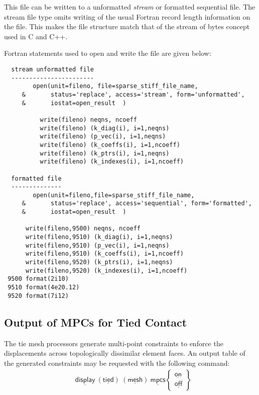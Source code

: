 \documentclass[11pt]{report}
\numberwithin{equation}{section}
\newcommand{\nin} {\noindent}
\newcommand{\ul} {\underline}
\newcommand{\hv} {\mathsf}   %
\newcommand{\ti}{\emph}
\begin{document}
This file can be written to a unformatted \ti{stream} or formatted sequential file. 
The stream file type omits writing of the usual Fortran record length 
information on the file. This makes the file structure
match that  of the stream of bytes concept used in C and C++.

Fortran statements used to open and 
write the file are given below:
\small
\begin{verbatim}
  stream unformatted file
  -----------------------
        open(unit=fileno, file=sparse_stiff_file_name,
     &       status='replace', access='stream', form='unformatted',
     &       iostat=open_result  )

          write(fileno) neqns, ncoeff
          write(fileno) (k_diag(i), i=1,neqns)
          write(fileno) (p_vec(i), i=1,neqns)
          write(fileno) (k_coeffs(i), i=1,ncoeff)
          write(fileno) (k_ptrs(i), i=1,neqns)
          write(fileno) (k_indexes(i), i=1,ncoeff)

  formatted file
  --------------
        open(unit=fileno,file=sparse_stiff_file_name,
     &       status='replace', access='sequential', form='formatted',
     &       iostat=open_result  )

      write(fileno,9500) neqns, ncoeff
      write(fileno,9510) (k_diag(i), i=1,neqns)
      write(fileno,9510) (p_vec(i), i=1,neqns)
      write(fileno,9510) (k_coeffs(i), i=1,ncoeff)
      write(fileno,9520) (k_ptrs(i), i=1,neqns)
      write(fileno,9520) (k_indexes(i), i=1,ncoeff)
 9500 format(2i10)
 9510 format(4e20.12)
 9520 format(7i12)
\end{verbatim}
\normalsize

\subsection{Output of MPCs for Tied Contact}
\nin The tie mesh processors generate multi-point constraints to enforce the 
displacements across topologically dissimilar element faces. 
An output table of the generated constraints may be requested with the following command:
\begin{align*}
&\hv{\ul{display}\  (\ul{tied})\  (\ul{mesh})\  \ul{mpcs}  }
\begin{Bmatrix}
\hv{\ul{on} }\\ \hv{\ul{off}}
\end{Bmatrix}
\end{align*}
\end{document}

